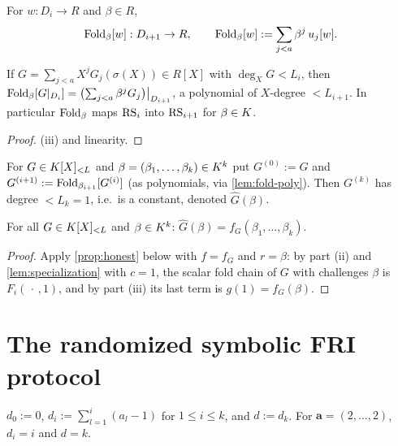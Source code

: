\begin{definition}[Fold]\label{def:fold}
For $w:D_i\to R$ and $\beta\in R$,
\[
\mathrm{Fold}_\beta[w]:D_{i+1}\to R,\qquad \mathrm{Fold}_\beta[w]:=\sum_{j<a}\beta^j\,u_j[w].
\]
\end{definition}

\begin{lemma}\label{lem:fold-poly}
If $G=\sum_{j<a}X^jG_j(\sigma(X))\in R[X]$ with $\deg_XG<L_i$, then
$\mathrm{Fold}_\beta[G|_{D_i}]=\bigl(\sum_{j<a}\beta^jG_j\bigr)\big|_{D_{i+1}}$, a polynomial of
$X$-degree $<L_{i+1}$. In particular $\mathrm{Fold}_\beta$ maps $\mathrm{RS}_i$ into $\mathrm{RS}_{i+1}$ for
$\beta\in K$.
\end{lemma}

\begin{proof}
(iii) and linearity.
\end{proof}

\begin{definition}\label{def:full-fold}
For $G\in K[X]_{<L}$ and $\beta=(\beta_1,\dots,\beta_k)\in K^k$ put
$G^{(0)}:=G$ and $G^{(i+1)}:=\mathrm{Fold}_{\beta_{i+1}}[G^{(i)}]$ (as polynomials, via
\cref{lem:fold-poly}). Then $G^{(k)}$ has degree $<L_k=1$, i.e.\ is a constant, denoted
$\widehat G(\beta)$.
\end{definition}

\begin{lemma}\label{lem:full-fold}
For all $G\in K[X]_{<L}$ and $\beta\in K^k$: $\widehat G(\beta)=f_G(\beta_1,\dots,\beta_k)$.
\end{lemma}

\begin{proof}
Apply \cref{prop:honest} below with $f=f_G$ and $r=\beta$: by part (ii) and
\cref{lem:specialization} with $c=1$, the scalar fold chain of $G$ with challenges $\beta$
is $F_i(\,\cdot\,,1)$, and by part (iii) its last term is $g(1)=f_G(\beta)$.
\end{proof}

\section{The randomized symbolic FRI protocol}

\begin{definition}\label{def:degree-caps}
$d_0:=0$, $d_i:=\sum_{l=1}^{i}(a_l-1)$ for $1\le i\le k$, and $d:=d_k$.
For $\mathbf a=(2,\dots,2)$, $d_i=i$ and $d=k$.
\end{definition}

